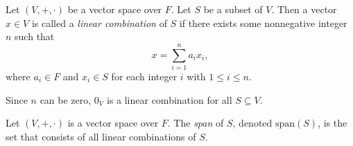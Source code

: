 \begin{definition}\label{def:linear-combination}
  Let $(V, +, \cdot)$ be a vector space over $F$.
  Let $S$ be a subset of $V$.
  Then a vector $x \in V$ is called a \emph{linear combination} of $S$ if
  there exists some nonnegative integer $n$ such that
  \begin{equation*}
    x = \sum_{i=1}^n a_ix_i,
  \end{equation*}
  where $a_i \in F$ and $x_i \in S$ for each integer $i$ with $1 \leq i \leq n$.
\end{definition}
\begin{remark}
  Since $n$ can be zero, $0_V$ is a linear combination for all $S \subseteq V$.
\end{remark}

\begin{definition}\label{def:span}
  Let $(V, +, \cdot)$ is a vector space over $F$.
  The \emph{span} of $S$, denoted $\mathrm{span}(S)$, is the set that
  consists of all linear combinations of $S$.
\end{definition}

